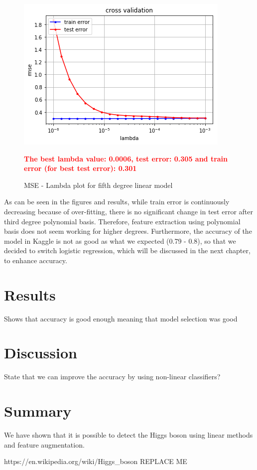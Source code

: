 \documentclass[10pt,conference,compsocconf]{IEEEtran}
\begin{document}
\begin{center}
\begin{figure}
\includegraphics[scale=0.4]{linear_5}
\centering
\caption{MSE - Lambda plot for fifth degree linear model}
\textbf{\textcolor{red}{The best lambda value: 0.0006, test error: 0.305 and train error (for best test error): 0.301}}
\end{figure}
\end{center}
\newpage
As can be seen in the figures and results, while train error is continuously decreasing because of over-fitting, there is no significant change in test error after third degree polynomial basis. Therefore, feature extraction using polynomial basis does not seem working for higher degrees. Furthermore, the accuracy of the model in Kaggle is not as good as what we expected (0.79 - 0.8), so that we decided to switch logistic regression, which will be discussed in the next chapter, to enhance accuracy.
\section{Results}
Shows that accuracy is good enough meaning that model selection was good
\section{Discussion}
State that we can improve the accuracy by using non-linear classifiers?
\section{Summary}
We have shown that it is possible to detect the Higgs boson using linear methods and feature augmentation.

\begin{thebibliography}{99}
 https://en.wikipedia.org/wiki/Higgs\_boson
 REPLACE ME
\end{thebibliography}
\end{document}
